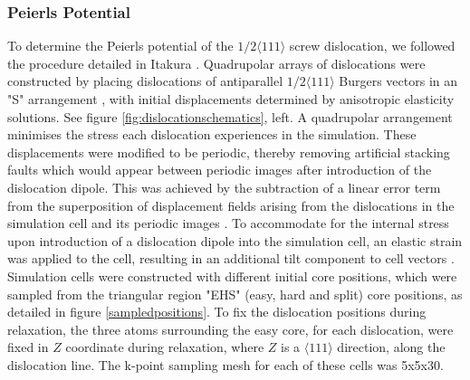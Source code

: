 \documentclass[a4paper,11pt]{article}
\numberwithin{equation}{chapter}
\numberwithin{listing}{chapter}
\begin{document}
\subsubsection{Peierls Potential}
\label{sec:orga615247}

To determine the Peierls potential of the \(1/2\langle 111 \rangle\) screw dislocation, we followed the
procedure detailed in Itakura \cite{Itakura2012}. Quadrupolar arrays of dislocations were
constructed by placing dislocations of antiparallel \(1/2\langle 111\rangle\) Burgers vectors in an "S"
arrangement \cite{Clouet2012}, with initial displacements determined by anisotropic elasticity
solutions. See figure \ref{fig:dislocationschematics}, left. A quadrupolar arrangement minimises
the stress each dislocation experiences in the simulation. These displacements were modified to
be periodic, thereby removing artificial stacking faults which would appear between periodic
images after introduction of the dislocation dipole. This was achieved by the subtraction of a
linear error term from the superposition of displacement fields arising from the dislocations in
the simulation cell and its periodic images \cite{vasilybulatov2006}. To accommodate for the
internal stress upon introduction of a dislocation dipole into the simulation cell, an elastic
strain was applied to the cell, resulting in an additional tilt component to cell vectors
\cite{Clouet2012,vasilybulatov2006,Clouet2009}. Simulation cells were constructed with different initial core
positions, which were sampled from the triangular region "EHS" (easy, hard and split) core
positions, as detailed in figure \ref{sampledpositions}. To fix the dislocation positions during
relaxation, the three atoms surrounding the easy core, for each dislocation, were fixed in \(Z\)
coordinate during relaxation, where \(Z\) is a \(\langle 111 \rangle\) direction, along the dislocation line. The
k-point sampling mesh for each of these cells was 5x5x30.
\end{document}
